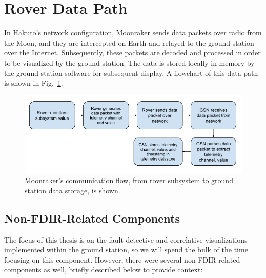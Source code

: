 \section{Rover Data Path}

In Hakuto's network configuration, Moonraker sends data packets over radio from the Moon, and they are intercepted on Earth and relayed to the ground station over the Internet. Subsequently, these packets are decoded and processed in order to be visualized by the ground station. The data is stored locally in memory by the ground station software for subsequent display. A flowchart of this data path is shown in Fig.~\ref{fig:data_path}.

\begin{figure}[h]
\centering
    \includegraphics[width=\columnwidth]{images/rover_data_flow.png}
    \caption{Moonraker's communication flow, from rover subsystem to ground station data storage, is shown.}
    \label{fig:data_path}
\end{figure}

\subsection{Non-FDIR-Related Components}

The focus of this thesis is on the fault detective and correlative visualizations implemented within the ground station, so we will spend the bulk of the time focusing on this component. However, there were several non-FDIR-related components as well, briefly described below to provide context:

